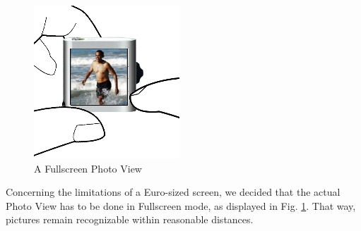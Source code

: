 \begin{figure}[h]
  \begin{center}
    \includegraphics[width=0.6\linewidth]{imgs/wt6.png}
  \end{center}
  \caption{A Fullscreen Photo View}
  \label{fig:wt6}
\end{figure}
%
Concerning the limitations of a Euro-sized screen, we decided that the actual Photo View has to be done in Fullscreen mode, as displayed in Fig. \ref{fig:wt6}. That way, pictures remain recognizable within reasonable distances.
%
